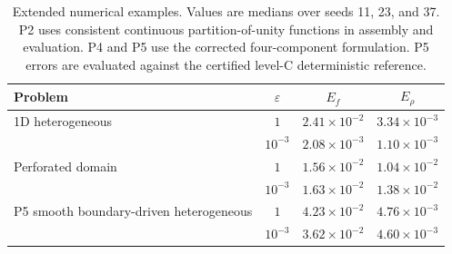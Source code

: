 \begin{table}[t]
\centering
\caption{Extended numerical examples. Values are medians over seeds 11, 23, and 37. P2 uses consistent continuous partition-of-unity functions in assembly and evaluation. P4 and P5 use the corrected four-component formulation. P5 errors are evaluated against the certified level-C deterministic reference.}
\label{tab:extended}
\begin{tabular}{lccc}
\toprule
Problem & $\varepsilon$ & $E_f$ & $E_\rho$\\
\midrule
1D heterogeneous & $1$ & $2.41\times10^{-2}$ & $3.34\times10^{-3}$\\
 & $10^{-3}$ & $2.08\times10^{-3}$ & $1.10\times10^{-3}$\\
\midrule
Perforated domain & $1$ & $1.56\times10^{-2}$ & $1.04\times10^{-2}$\\
 & $10^{-3}$ & $1.63\times10^{-2}$ & $1.38\times10^{-2}$\\
\midrule
P5 smooth boundary-driven heterogeneous & $1$ & $4.23\times10^{-2}$ & $4.76\times10^{-3}$\\
 & $10^{-3}$ & $3.62\times10^{-2}$ & $4.60\times10^{-3}$\\
\bottomrule
\end{tabular}
\end{table}
